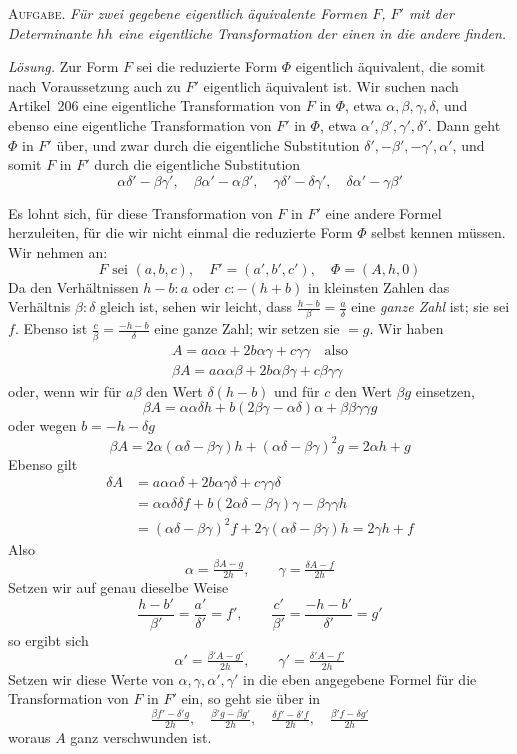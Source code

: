 \textsc{Aufgabe.} \textit{Für zwei gegebene eigentlich äquivalente Formen $F$, $F'$ mit der Determinante $hh$ eine eigentliche Transformation der einen in die andere finden.}

\textit{Lösung.} Zur Form $F$ sei die reduzierte Form $\Phi$ eigentlich äquivalent, die somit nach Voraussetzung auch zu $F'$ eigentlich äquivalent ist. Wir suchen nach Artikel~206 eine eigentliche Transformation von $F$ in $\Phi$, etwa $\alpha,\beta,\gamma,\delta$, und ebenso eine eigentliche Transformation von $F'$ in $\Phi$, etwa $\alpha',\beta',\gamma',\delta'$. Dann geht $\Phi$ in $F'$ über, und zwar durch die eigentliche Substitution $\delta',-\beta',-\gamma',\alpha'$, und somit $F$ in $F'$ durch die eigentliche Substitution
\[
\alpha\delta'-\beta\gamma',\quad\beta\alpha'-\alpha\beta',\quad
\gamma\delta'-\delta\gamma',\quad\delta\alpha'-\gamma\beta'
\]

Es lohnt sich, für diese Transformation von $F$ in $F'$ eine andere Formel herzuleiten, für die wir nicht einmal die reduzierte Form $\Phi$ selbst kennen müssen. Wir nehmen an:
\[
F\text{ sei }(a,b,c),\quad F'=(a',b',c'),\quad\Phi=(A,h,0)
\]
Da den Verhältnissen $h-b:a$ oder $c:-(h+b)$ in kleinsten Zahlen das Verhältnis $\beta:\delta$ gleich ist, sehen wir leicht, dass $\frac{h-b}{\beta}=\frac a\delta$ eine \textit{ganze Zahl} ist; sie sei $f$. Ebenso ist $\frac c\beta=\frac{-h-b}{\delta}$ eine ganze Zahl; wir setzen sie $=g$. Wir haben
\[
\begin{gathered}A=a\alpha\alpha+2b\alpha\gamma+c\gamma\gamma\quad\text{also}\\
\beta A=a\alpha\alpha\beta+2b\alpha\beta\gamma+c\beta\gamma\gamma\end{gathered}
\]
oder, wenn wir für $a\beta$ den Wert $\delta(h-b)$ und für $c$ den Wert $\beta g$ einsetzen,
\[
\beta A=\alpha\alpha\delta h+b(2\beta\gamma-\alpha\delta)\alpha+\beta\beta\gamma\gamma g
\]
oder wegen $b=-h-\delta g$
\[
\beta A=2\alpha(\alpha\delta-\beta\gamma)h+(\alpha\delta-\beta\gamma)^2g=2\alpha h+g
\]
Ebenso gilt
\[
\begin{aligned}
\delta A&=a\alpha\alpha\delta+2b\alpha\gamma\delta+c\gamma\gamma\delta\\
&=\alpha\alpha\delta\delta f+b(2\alpha\delta-\beta\gamma)\gamma-\beta\gamma\gamma h\\
&=(\alpha\delta-\beta\gamma)^2f+2\gamma(\alpha\delta-\beta\gamma)h=2\gamma h+f
\end{aligned}
\]
Also
\[
\alpha=\tfrac{\beta A-g}{2h},\qquad\gamma=\tfrac{\delta A-f}{2h}
\]
Setzen wir auf genau dieselbe Weise
\[
\frac{h-b'}{\beta'}=\frac{a'}{\delta'}=f',\qquad
\frac{c'}{\beta'}=\frac{-h-b'}{\delta'}=g'
\]
so ergibt sich
\[
\alpha'=\tfrac{\beta' A-g'}{2h},\qquad\gamma'=\tfrac{\delta' A-f'}{2h}
\]
Setzen wir diese Werte von $\alpha,\gamma,\alpha',\gamma'$ in die eben angegebene Formel für die Transformation von $F$ in $F'$ ein, so geht sie über in
\[
\tfrac{\beta f'-\delta'g}{2h},\quad
\tfrac{\beta'g-\beta g'}{2h},\quad
\tfrac{\delta f'-\delta'f}{2h},\quad
\tfrac{\beta'f-\delta g'}{2h}
\]
woraus $A$ ganz verschwunden ist.

